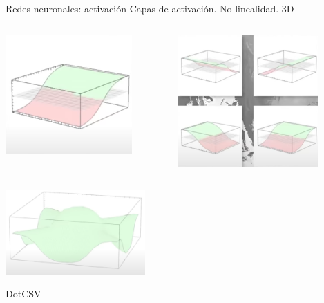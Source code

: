 \begin{frame}{Redes neuronales: activación}
Capas de activación. No linealidad. 3D

\begin{columns}[c]
\centering
\begin{column}{0.5\textwidth}
    \centering
    \includegraphics[width=0.8\textwidth]{figures/Introduccion/activacion_3d.png}
\end{column}
\begin{column}{0.5\textwidth}
    \centering
    \includegraphics[width=0.8\textwidth]{figures/Introduccion/activacion_3d_varias.png}
\end{column}
\end{columns}

\centering
\includegraphics[width=0.4\textwidth]{figures/Introduccion/activacion_3d_combi.png}

\scriptsize{DotCSV}

\end{frame}

